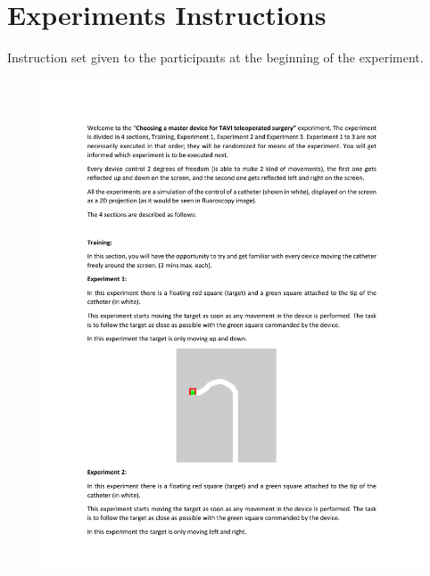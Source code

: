
\chapter{Experiments Instructions}\label{sec:apinst}

Instruction set given to the participants at the beginning of the experiment.

  \begin{figure}
    \centering
    \includegraphics[page={1}, width=1.0\linewidth ]{img/InstructionsQuestionary.pdf}
  \end{figure}
